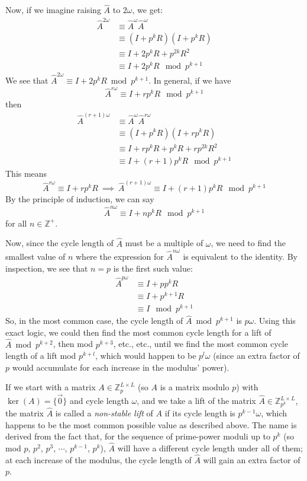 \documentclass[a4paper, 12pt, reqno]{amsart}
\begin{document}
		Now, if we imagine raising $\hat{A}$ to $2\omega$, we get:
		\begin{align*}
			\hat{A}^{2\omega} & \equiv \hat{A}^\omega\hat{A}^\omega \\
			                  & \equiv (I + p^kR)(I + p^kR)         \\
							  & \equiv I + 2p^kR + p^{2k}R^2        \\
						      & \equiv I + 2p^kR \mod{p^{k+1}}
		\end{align*}
		We see that $\hat{A}^{2\omega} \equiv I + 2p^kR \bmod{p^{k+1}}$. In general, if we have
		\[
			\hat{A}^{r\omega} \equiv I + rp^kR \mod{p^{k+1}}
		\]
		then
		\begin{align*}
			\hat{A}^{(r+1)\omega} & \equiv \hat{A}^{\omega}\hat{A}^{r\omega} \\
			                      & \equiv (I + p^kR)(I + rp^kR)             \\
							      & \equiv I + rp^kR + p^kR + rp^{2k}R^2     \\
								  & \equiv I + (r+1)p^kR \mod{p^{k+1}}
		\end{align*}
		This means
		\[
			\hat{A}^{r\omega} \equiv I + rp^kR \ \implies\  \hat{A}^{(r+1)\omega} \equiv I + (r+1)p^kR \mod{p^{k+1}}
		\]
		By the principle of induction, we can say
		\[
			\hat{A}^{n\omega} \equiv I + np^kR \mod{p^{k+1}}
		\]
		for all $n \in \mathds{Z}^+$.
		
		Now, since the cycle length of $\hat{A}$ must be a multiple of $\omega$, we need to find the smallest value of $n$ where the expression for $\hat{A}^{n\omega}$ is
		equivalent to the identity. By inspection, we see that $n = p$ is the first such value:
		\begin{align*}
			\hat{A}^{p\omega} & \equiv I + pp^kR    \\
			                  & \equiv I + p^{k+1}R \\
							  & \equiv I \mod{p^{k+1}}
		\end{align*}
		So, in the most common case, the cycle length of $\hat{A} \bmod{p^{k+1}}$ is $p\omega$. Using this exact logic, we could then find the most common cycle length for
		a lift of $\hat{A} \bmod{p^{k+2}}$, then mod $p^{k+3}$, etc., etc., until we find the most common cycle length of a lift mod $p^{k+l}$, which would happen to
		be $p^l\omega$ (since an extra factor of $p$ would accumulate for each increase in the modulus' power).
		
		If we start with a matrix $A \in \mathds{Z}_p^{L \times L}$ (so $A$ is a matrix modulo $p$) with $\ker(A) = \{\vec{0}\}$ and cycle length $\omega$, and we take a 
		lift of the matrix $\hat{A} \in \mathds{Z}_{p^k}^{L \times L}$, the matrix $\hat{A}$ is called a \emph{non-stable lift} of $A$ if its cycle length is $p^{k-1}\omega$,
		which happens to be the most common possible value as described above. The name is derived from the fact that, for the sequence of prime-power moduli up to $p^k$
		(so mod $p$, $p^2$, $p^3$, $\cdots$, $p^{k-1}$, $p^k$), $\hat{A}$ will have a different cycle length under all of them; at each increase of the modulus, the cycle 
		length of $\hat{A}$ will gain an extra factor of $p$.
		
\end{document}
